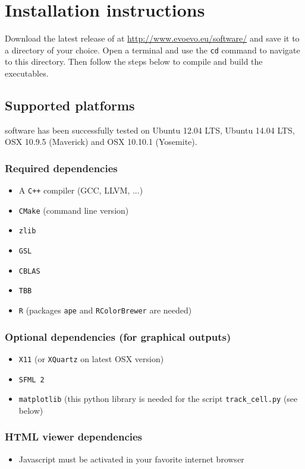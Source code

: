 \chapter{Installation instructions}

Download the latest release of {\packageName} at \href{http://www.evoevo.eu/software/}{http://www.evoevo.eu/software/} and save it to a directory of your choice. Open a terminal and use the \texttt{cd} command to navigate to this directory. Then follow the steps below to compile and build the executables.

\section{Supported platforms}
{\packageName} software has been successfully tested on Ubuntu 12.04 LTS, Ubuntu 14.04 LTS, OSX 10.9.5 (Maverick) and OSX 10.10.1 (Yosemite).

\subsection{Required dependencies}
\begin{itemize}
	\item A \texttt{C++} compiler (GCC, LLVM, ...)
	\item \texttt{CMake} (command line version)
	\item \texttt{zlib}
	\item \texttt{GSL}
	\item \texttt{CBLAS}
	\item \texttt{TBB}
	\item \texttt{R} (packages \texttt{ape} and \texttt{RColorBrewer} are needed)
\end{itemize}

\subsection{Optional dependencies (for graphical outputs)}
\begin{itemize}
	\item \texttt{X11} (or \texttt{XQuartz} on latest OSX version)
	\item \texttt{SFML 2}
	\item \texttt{matplotlib} (this python library is needed for the script \texttt{track\_cell.py} (see below)
\end{itemize}

\subsection{HTML viewer dependencies}
\begin{itemize}
	\item Javascript must be activated in your favorite internet browser
\end{itemize}

